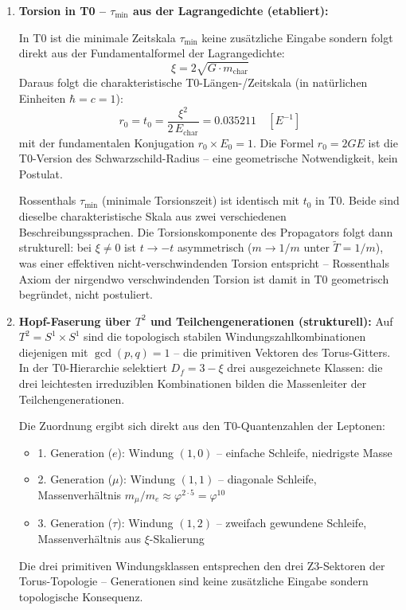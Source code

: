 \documentclass[12pt, a4paper]{article}
\newcommand{\xipar}{\xi}
\newcommand{\Tfield}{\tilde{T}}
\newcommand{\Dfrak}{D_f}
\begin{document}
\begin{enumerate}

  \item \textbf{Torsion in T0 -- $\tau_{\min}$ aus der Lagrangedichte (etabliert):}

  In T0 ist die minimale Zeitskala $\tau_{\min}$ keine zusätzliche Eingabe sondern folgt direkt aus der Fundamentalformel der Lagrangedichte:
  \begin{equation}
    \xipar = 2\sqrt{G \cdot m_{\text{char}}}
  \end{equation}
  Daraus folgt die charakteristische T0-Längen-/Zeitskala (in natürlichen Einheiten $\hbar = c = 1$):
  \begin{equation}
    r_0 = t_0 = \frac{\xipar^2}{2\,E_{\text{char}}} = 0.035211 \quad [E^{-1}]
  \end{equation}
  mit der fundamentalen Konjugation $r_0 \times E_0 = 1$. Die Formel $r_0 = 2GE$ ist die T0-Version des Schwarzschild-Radius -- eine geometrische Notwendigkeit, kein Postulat.

  Rossenthals $\tau_{\min}$ (minimale Torsionszeit) ist identisch mit $t_0$ in T0. Beide sind dieselbe charakteristische Skala aus zwei verschiedenen Beschreibungssprachen. Die Torsionskomponente des Propagators folgt dann strukturell: bei $\xipar \neq 0$ ist $t \to -t$ asymmetrisch ($m \to 1/m$ unter $\Tfield = 1/m$), was einer effektiven nicht-verschwindenden Torsion entspricht -- Rossenthals Axiom der nirgendwo verschwindenden Torsion ist damit in T0 geometrisch begründet, nicht postuliert.

  \item \textbf{Hopf-Faserung über $T^2$ und Teilchengenerationen (strukturell):}
  Auf $T^2 = S^1 \times S^1$ sind die topologisch stabilen Windungszahlkombinationen diejenigen mit $\gcd(p,q) = 1$ -- die primitiven Vektoren des Torus-Gitters. In der T0-Hierarchie selektiert $\Dfrak = 3 - \xipar$ drei ausgezeichnete Klassen: die drei leichtesten irreduziblen Kombinationen bilden die Massenleiter der Teilchengenerationen.

  Die Zuordnung ergibt sich direkt aus den T0-Quantenzahlen der Leptonen:
  \begin{itemize}[noitemsep]
    \item 1. Generation ($e$): Windung $(1,0)$ -- einfache Schleife, niedrigste Masse
    \item 2. Generation ($\mu$): Windung $(1,1)$ -- diagonale Schleife, Massenverhältnis $m_\mu/m_e \approx \varphi^{2 \cdot 5} = \varphi^{10}$
    \item 3. Generation ($\tau$): Windung $(1,2)$ -- zweifach gewundene Schleife, Massenverhältnis aus $\xipar$-Skalierung
  \end{itemize}
  Die drei primitiven Windungsklassen entsprechen den drei Z3-Sektoren der Torus-Topologie -- Generationen sind keine zusätzliche Eingabe sondern topologische Konsequenz.


\end{enumerate}
\end{document}
